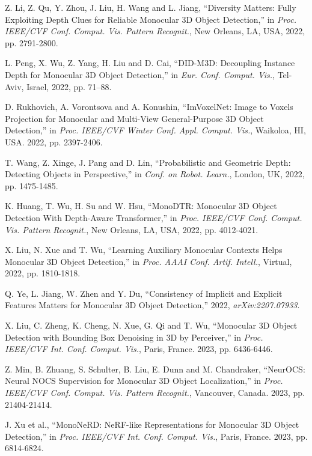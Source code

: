 \documentclass[journal]{IEEEtran}
\begin{document}
\begin{thebibliography}{1}
		Z. Li, Z. Qu, Y. Zhou, J. Liu, H. Wang and L. Jiang, “Diversity Matters: Fully Exploiting Depth Clues for Reliable Monocular 3D Object Detection,” in \textit{Proc. IEEE/CVF Conf. Comput. Vis. Pattern Recognit.}, New Orleans, LA, USA, 2022, pp. 2791-2800.
		
		L. Peng, X. Wu, Z. Yang, H. Liu and D. Cai, “DID-M3D: Decoupling Instance Depth for Monocular 3D Object Detection,” in \textit{Eur. Conf. Comput. Vis.}, Tel-Aviv, Israel, 2022, pp. 71–88.
				
		D. Rukhovich, A. Vorontsova and A. Konushin, “ImVoxelNet: Image to Voxels Projection for Monocular and Multi-View General-Purpose 3D Object Detection,” in \textit{Proc. IEEE/CVF Winter Conf. Appl. Comput. Vis.}, Waikoloa, HI, USA. 2022, pp. 2397-2406.
		
		T. Wang, Z. Xinge, J. Pang and D. Lin, “Probabilistic and Geometric Depth: Detecting Objects in Perspective,” in \textit{Conf. on Robot. Learn.}, London, UK, 2022, pp. 1475-1485.
			
		K. Huang, T. Wu, H. Su and W. Hsu, “MonoDTR: Monocular 3D Object Detection With Depth-Aware Transformer,” in \textit{Proc. IEEE/CVF Conf. Comput. Vis. Pattern Recognit.}, New Orleans, LA, USA, 2022,  pp. 4012-4021.
		
		
		X. Liu, N. Xue and T. Wu, “Learning Auxiliary Monocular Contexts Helps Monocular 3D Object Detection,” in \textit{Proc. AAAI Conf. Artif. Intell.}, Virtual, 2022, pp. 1810-1818.
		
		Q. Ye, L. Jiang, W. Zhen and Y. Du, “Consistency of Implicit and Explicit Features Matters for Monocular 3D Object Detection,” 2022, \textit{arXiv:2207.07933}.
		
		X. Liu, C. Zheng, K. Cheng, N. Xue, G. Qi and T. Wu, “Monocular 3D Object Detection with Bounding Box Denoising in 3D by Perceiver,” in \textit{Proc. IEEE/CVF Int. Conf. Comput. Vis.}, Paris, 
		France. 2023, pp. 6436-6446.
		
		Z. Min, B. Zhuang, S. Schulter, B. Liu, E. Dunn and M. Chandraker, “NeurOCS: Neural NOCS Supervision for Monocular 3D Object Localization,” in \textit{Proc. IEEE/CVF Conf. Comput. Vis. Pattern Recognit.}, Vancouver, Canada. 2023, pp. 21404-21414. 
		
		J. Xu et al., “MonoNeRD: NeRF-like Representations for Monocular 3D Object Detection,” in \textit{Proc. IEEE/CVF Int. Conf. Comput. Vis.}, Paris, France. 2023, pp. 6814-6824. 
		

\end{thebibliography}
\end{document}
